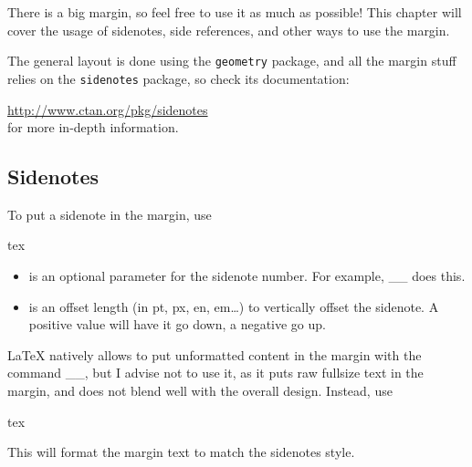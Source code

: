 \documentclass[
    11pt,
]{tufte-style-thesis}
\begin{document}
There is a big margin, so feel free to use it as much as possible! This chapter will cover the usage of sidenotes, side references, and other ways to use the margin.

The general layout is done using the \texttt{geometry} package, and all the margin stuff relies on the \texttt{sidenotes} package, so check its documentation:

\centering\url{http://www.ctan.org/pkg/sidenotes}\\
\RaggedRight\noindent for more in-depth information.

\subsection{Sidenotes}

To put a sidenote in the margin, use
\begin{codebox}{tex}
\end{codebox}
\begin{itemize}
\item
{} is an optional parameter for the sidenote number. For example, __ does this.
\item
{} is an offset length (in pt, px, en, em\dots) to vertically offset the sidenote. A positive value will have it go down, a negative go up.
\end{itemize}

\LaTeX{} natively allows to put unformatted content in the margin with the command __, but I advise not to use it, as it puts raw fullsize text in the margin, and does not blend well with the overall design. Instead, use
\begin{codebox}{tex}
\end{codebox}
This will format the margin text to match the sidenotes style.
\end{document}
